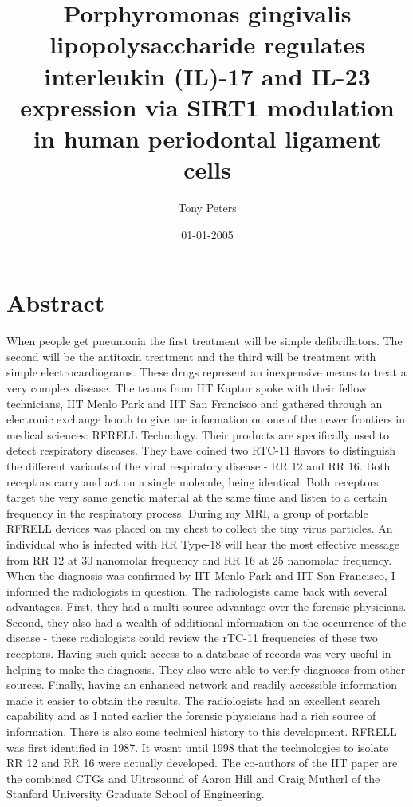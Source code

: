 \documentclass{article}%
\title{Porphyromonas gingivalis lipopolysaccharide regulates interleukin (IL){-}17 and IL{-}23 expression via SIRT1 modulation in human periodontal ligament cells}%
\author{Tony Peters}%
\affil{Breast Disease Center, Southwest Hospital, Third Military Medical University, Chongqing, P.R. China, Department of Pathology, The Fourth Hospital of Hebei Medical University, Shijiazhuang, P.R. China, Department of Breast Disease Center, The Fourth Hospital of Hebei Medical University, Shijiazhuang, P.R. China}%
\date{01{-}01{-}2005}%
\begin{document}
%
\normalsize%
\maketitle%
\section{Abstract}%
\label{sec:Abstract}%
When people get pneumonia the first treatment will be simple defibrillators. The second will be the antitoxin treatment and the third will be treatment with simple electrocardiograms. These drugs represent an inexpensive means to treat a very complex disease.\newline%
The teams from IIT Kaptur spoke with their fellow technicians, IIT Menlo Park and IIT San Francisco and gathered through an electronic exchange booth to give me information on one of the newer frontiers in medical sciences: RFRELL Technology. Their products are specifically used to detect respiratory diseases. They have coined two RTC{-}11 flavors to distinguish the different variants of the viral respiratory disease {-} RR 12 and RR 16. Both receptors carry and act on a single molecule, being identical. Both receptors target the very same genetic material at the same time and listen to a certain frequency in the respiratory process.\newline%
During my MRI, a group of portable RFRELL devices was placed on my chest to collect the tiny virus particles. An individual who is infected with RR Type{-}18 will hear the most effective message from RR 12 at 30 nanomolar frequency and RR 16 at 25 nanomolar frequency. When the diagnosis was confirmed by IIT Menlo Park and IIT San Francisco, I informed the radiologists in question. The radiologists came back with several advantages. First, they had a multi{-}source advantage over the forensic physicians. Second, they also had a wealth of additional information on the occurrence of the disease {-} these radiologists could review the rTC{-}11 frequencies of these two receptors. Having such quick access to a database of records was very useful in helping to make the diagnosis. They also were able to verify diagnoses from other sources. Finally, having an enhanced network and readily accessible information made it easier to obtain the results. The radiologists had an excellent search capability and as I noted earlier the forensic physicians had a rich source of information.\newline%
There is also some technical history to this development. RFRELL was first identified in 1987. It wasnt until 1998 that the technologies to isolate RR 12 and RR 16 were actually developed.\newline%
The co{-}authors of the IIT paper are the combined CTGs and Ultrasound of Aaron Hill and Craig Mutherl of the Stanford University Graduate School of Engineering.
\end{document}
